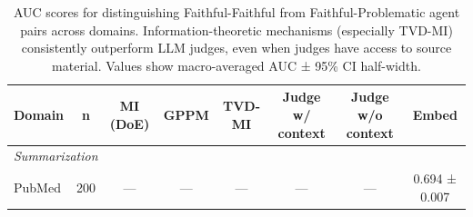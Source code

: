 \begin{table}[t]
\centering
\caption{AUC scores for distinguishing Faithful-Faithful from Faithful-Problematic agent pairs across domains. Information-theoretic mechanisms (especially TVD-MI) consistently outperform LLM judges, even when judges have access to source material. Values show macro-averaged AUC ± 95\% CI half-width.}
\label{tab:auc_results}
\begin{tabular}{lccccccc}
\toprule
\textbf{Domain} & \textbf{n} & \textbf{MI (DoE)} & \textbf{GPPM} & \textbf{TVD-MI} & \textbf{Judge w/ context} & \textbf{Judge w/o context} & \textbf{Embed} \\
\midrule
\multicolumn{8}{l}{\textit{Summarization}} \\
PubMed & 200 & — & — & — & — & — & 0.694 ± 0.007 \\
\midrule
\bottomrule
\end{tabular}
\end{table}